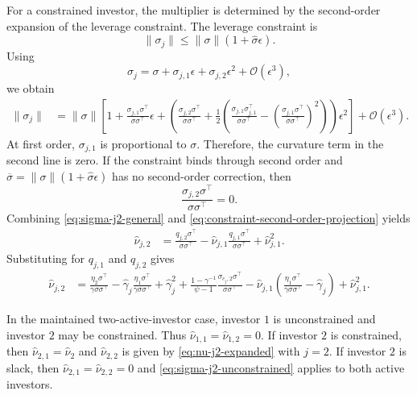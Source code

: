 For a constrained investor, the multiplier is determined by the second-order expansion of the leverage constraint.
The leverage constraint is
\begin{equation}
    \|\sigma_j\| \leq \|\sigma\|(1+\hat{\sigma}\epsilon).
\end{equation}
Using
\begin{equation}
    \sigma_j=\sigma+\sigma_{j,1}\epsilon+\sigma_{j,2}\epsilon^2+\mathcal{O}(\epsilon^3),
\end{equation}
we obtain
\begin{align}
    \|\sigma_j\|
    &= \|\sigma\|\left[1+\frac{\sigma_{j,1}\sigma^\top}{\sigma\sigma^\top}\epsilon
    +\left(\frac{\sigma_{j,2}\sigma^\top}{\sigma\sigma^\top}
    +\frac{1}{2}\left(\frac{\sigma_{j,1}\sigma_{j,1}^\top}{\sigma\sigma^\top}
    -\left(\frac{\sigma_{j,1}\sigma^\top}{\sigma\sigma^\top}\right)^2\right)\right)\epsilon^2\right]
    +\mathcal{O}(\epsilon^3).
\end{align}
At first order, $\sigma_{j,1}$ is proportional to $\sigma$.
Therefore, the curvature term in the second line is zero.
If the constraint binds through second order and $\overline{\sigma}=\|\sigma\|(1+\hat{\sigma}\epsilon)$ has no second-order correction, then
\begin{equation}\label{eq:constraint-second-order-projection}
    \frac{\sigma_{j,2}\sigma^\top}{\sigma\sigma^\top}=0.
\end{equation}
Combining \eqref{eq:sigma-j2-general} and \eqref{eq:constraint-second-order-projection} yields
\begin{align}\label{eq:nu-j2-second-order}
    \hat{\nu}_{j,2}
    &= \frac{q_{j,2}\sigma^\top}{\sigma\sigma^\top}
    -\hat{\nu}_{j,1}\frac{q_{j,1}\sigma^\top}{\sigma\sigma^\top}
    +\hat{\nu}_{j,1}^2.
\end{align}
Substituting for $q_{j,1}$ and $q_{j,2}$ gives
\begin{align}\label{eq:nu-j2-expanded}
    \hat{\nu}_{j,2}
    &= \frac{\eta_2\sigma^\top}{\gamma\sigma\sigma^\top}
    -\hat{\gamma}_j\frac{\eta_1\sigma^\top}{\gamma\sigma\sigma^\top}
    +\hat{\gamma}_j^2
    +\frac{1-\gamma^{-1}}{\psi-1}\frac{\sigma_{c_j,2}\sigma^\top}{\sigma\sigma^\top}
    -\hat{\nu}_{j,1}\left(\frac{\eta_1\sigma^\top}{\gamma\sigma\sigma^\top}-\hat{\gamma}_j\right)
    +\hat{\nu}_{j,1}^2.
\end{align}

In the maintained two-active-investor case, investor $1$ is unconstrained and investor $2$ may be constrained.
Thus $\hat{\nu}_{1,1}=\hat{\nu}_{1,2}=0$.
If investor $2$ is constrained, then $\hat{\nu}_{2,1}=\hat{\nu}_2$ and $\hat{\nu}_{2,2}$ is given by \eqref{eq:nu-j2-expanded} with $j=2$.
If investor $2$ is slack, then $\hat{\nu}_{2,1}=\hat{\nu}_{2,2}=0$ and \eqref{eq:sigma-j2-unconstrained} applies to both active investors.

